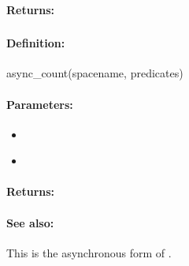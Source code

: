 \paragraph{Returns:}


\pagebreak
\subsubsection{}
\label{api:ruby:async_count}


\paragraph{Definition:}
\begin{rubycode}
async_count(spacename, predicates)
\end{rubycode}

\paragraph{Parameters:}
\begin{itemize}[noitemsep]
\item {}\\

\item {}\\

\end{itemize}

\paragraph{Returns:}


\paragraph{See also:}  This is the asynchronous form of .
